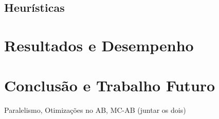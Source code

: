 \documentclass[12pt,a4paper,oneside]{article}
\begin{document}
\lipsum[1]

\lipsum[2]

\lipsum[3]

\subsection{Heurísticas}

\lipsum[1]

\lipsum[2]

\lipsum[3]


\section{Resultados e Desempenho}
\label{sec:resdes}

\lipsum[1]

\lipsum[2]

\lipsum[3]


\section{Conclusão e Trabalho Futuro}
\label{sec:conc}

Paralelismo, Otimizações no AB, MC-AB (juntar os dois)\cite{Dutra:2015}

\lipsum[1]

\lipsum[2]



\end{document}
